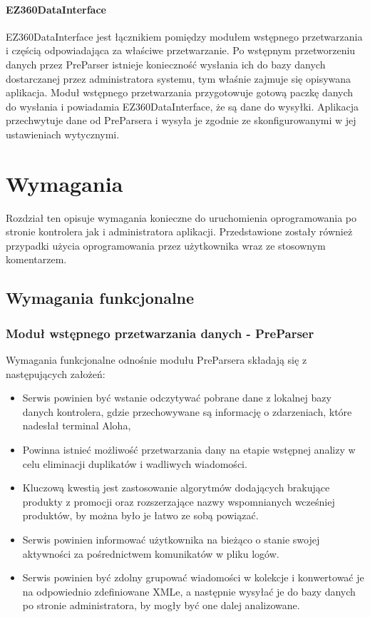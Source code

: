 \documentclass[a4paper]{book}
\begin{document}
\subsubsection{EZ360DataInterface}
EZ360DataInterface jest łącznikiem pomiędzy modułem wstępnego przetwarzania i częścią odpowiadająca za właściwe przetwarzanie. Po wstępnym przetworzeniu danych przez PreParser istnieje konieczność wysłania ich do bazy danych dostarczanej przez administratora systemu, tym właśnie zajmuje się opisywana aplikacja. Moduł wstępnego przetwarzania przygotowuje gotową paczkę danych do wysłania i powiadamia EZ360DataInterface, że są dane do wysyłki. Aplikacja przechwytuje dane od PreParsera i wysyła je zgodnie ze skonfigurowanymi w jej ustawieniach wytycznymi.
\chapter{Wymagania}
\label{rozdzial3}
Rozdział ten opisuje wymagania konieczne do uruchomienia oprogramowania po stronie kontrolera jak i administratora aplikacji. Przedstawione zostały również przypadki użycia oprogramowania przez użytkownika wraz ze stosownym komentarzem.
\section{Wymagania funkcjonalne}
\subsection{Moduł wstępnego przetwarzania danych - PreParser}
Wymagania funkcjonalne odnośnie modułu PreParsera składają się z następujących założeń:
\begin{itemize}
	\item Serwis powinien być wstanie odczytywać pobrane dane z lokalnej bazy danych kontrolera, gdzie przechowywane są informację o zdarzeniach, które nadesłał terminal Aloha,
	\item Powinna istnieć możliwość przetwarzania dany na etapie wstępnej analizy w celu eliminacji duplikatów i wadliwych wiadomości.
	\item Kluczową kwestią jest zastosowanie algorytmów dodających brakujące produkty z promocji oraz rozszerzające nazwy wspomnianych wcześniej produktów, by można było je łatwo ze sobą powiązać.
	\item Serwis powinien informować użytkownika na bieżąco o stanie swojej aktywności za pośrednictwem komunikatów w pliku logów.
	\item Serwis powinien być zdolny grupować wiadomości w kolekcje i konwertować je na odpowiednio zdefiniowane XMLe, a następnie wysyłać je do bazy danych po stronie administratora, by mogły być one dalej analizowane.
\end{itemize}
\end{document}

